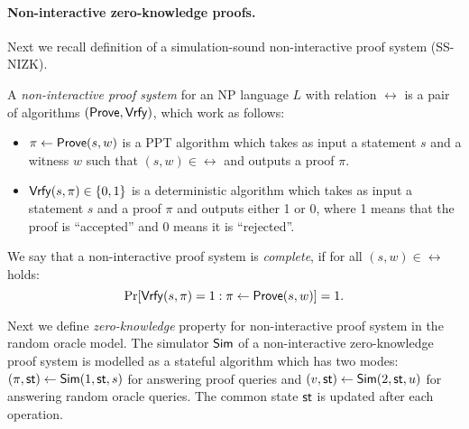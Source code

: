


\paragraph{Non-interactive zero-knowledge proofs.}
Next we recall definition of a simulation-sound non-interactive proof system (SS-NIZK). 

\begin{definition} 
A \emph{non-interactive proof system} for an NP language $L$ with relation $\rel$ is a pair of algorithms $(\mathsf{Prove}, \mathsf{Vrfy})$, which work as follows:
\begin{itemize}
\item $\pi \leftarrow \mathsf{Prove}(s,w)$ is a PPT algorithm which takes as input a statement $s$ and a witness $w$ such that $(s,w) \in \rel$ and outputs a proof $\pi$.
\item $\mathsf{Vrfy}(s, \pi) \in \{0,1\}$ is a deterministic algorithm which takes as input a statement $s$ and a proof $\pi$ and outputs either 1 or 0, where 1 means that the proof is ``accepted'' and 0 means it is ``rejected''.
\end{itemize}
We say that a non-interactive proof system is \emph{complete}, if for all $(s, w) \in \rel$ holds:
\[\Pr[\mathsf{Vrfy}(s,\pi)=1:\pi \leftarrow \mathsf{Prove}(s,w)] =1.\] 
\end{definition}

Next we define \emph{zero-knowledge} property for non-interactive proof system in the random oracle model. The simulator $\mathsf{Sim}$ of a non-interactive zero-knowledge proof system is modelled as a stateful algorithm which has two modes: $(\pi, \mathsf{st}) \leftarrow \mathsf{Sim}(1, \mathsf{st}, s)$  for answering proof queries and $(v, \mathsf{st}) \leftarrow \mathsf{Sim}(2, \mathsf{st}, u)$ for answering random oracle queries. The common state $\mathsf{st}$ is updated after each operation.



